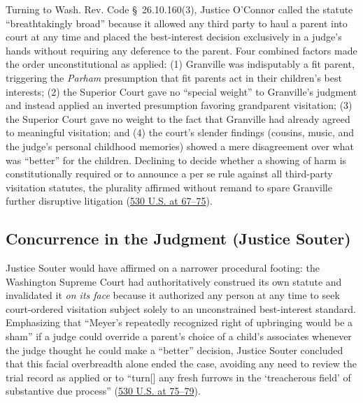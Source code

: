 \documentclass[12pt]{article}
\begin{document}
Turning to Wash. Rev. Code \S\ 26.10.160(3), Justice O'Connor called the statute ``breathtakingly broad'' because it allowed any third party to haul a parent into court at any time and placed the best-interest decision exclusively in a judge's hands without requiring any deference to the parent. Four combined factors made the order unconstitutional as applied: (1) Granville was indisputably a fit parent, triggering the \textit{Parham} presumption that fit parents act in their children's best interests; (2) the Superior Court gave no ``special weight'' to Granville's judgment and instead applied an inverted presumption favoring grandparent visitation; (3) the Superior Court gave no weight to the fact that Granville had already agreed to meaningful visitation; and (4) the court's slender findings (cousins, music, and the judge's personal childhood memories) showed a mere disagreement over what was ``better'' for the children. Declining to decide whether a showing of harm is constitutionally required or to announce a per se rule against all third-party visitation statutes, the plurality affirmed without remand to spare Granville further disruptive litigation (\href{https://www.law.cornell.edu/supremecourt/text/99-138}{530 U.S. at 67--75}).

\subsection{Concurrence in the Judgment (Justice Souter)}
Justice Souter would have affirmed on a narrower procedural footing: the Washington Supreme Court had authoritatively construed its own statute and invalidated it \textit{on its face} because it authorized any person at any time to seek court-ordered visitation subject solely to an unconstrained best-interest standard. Emphasizing that ``Meyer's repeatedly recognized right of upbringing would be a sham'' if a judge could override a parent's choice of a child's associates whenever the judge thought he could make a ``better'' decision, Justice Souter concluded that this facial overbreadth alone ended the case, avoiding any need to review the trial record as applied or to ``turn[] any fresh furrows in the `treacherous field' of substantive due process'' (\href{https://www.law.cornell.edu/supremecourt/text/99-138}{530 U.S. at 75--79}).
\end{document}
